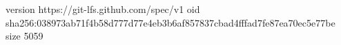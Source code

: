 version https://git-lfs.github.com/spec/v1
oid sha256:038973ab71f4b58d777d77e4eb3b6af857837cbad4fffad7fe87ea70ec5e77be
size 5059
